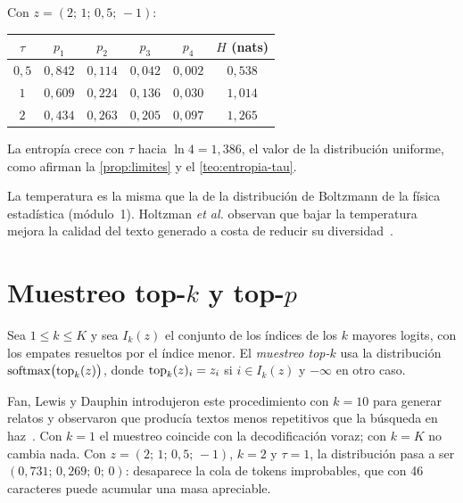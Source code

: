 \begin{ejemplo}\label{ej:temperatura}
Con $z=(2;\allowbreak\,1;\allowbreak\,0{,}5;\allowbreak\,-1)$:
\begin{center}\small
\begin{tabular}{@{}cccccc@{}}
\toprule
$\tau$ & $p_1$ & $p_2$ & $p_3$ & $p_4$ & $H$ (nats) \\
\midrule
$0{,}5$ & $0{,}842$ & $0{,}114$ & $0{,}042$ & $0{,}002$ & $0{,}538$ \\
$1$ & $0{,}609$ & $0{,}224$ & $0{,}136$ & $0{,}030$ & $1{,}014$ \\
$2$ & $0{,}434$ & $0{,}263$ & $0{,}205$ & $0{,}097$ & $1{,}265$ \\
\bottomrule
\end{tabular}
\end{center}
La entropía crece con $\tau$ hacia $\ln 4=1{,}386$, el valor de la distribución uniforme, como afirman la \cref{prop:limites} y el \cref{teo:entropia-tau}.
\end{ejemplo}

La temperatura es la misma que la de la distribución de Boltzmann de la física estadística (módulo~1). Holtzman \emph{et al.} observan que bajar la temperatura mejora la calidad del texto generado a costa de reducir su diversidad~\cite[§3.3]{holtzman}.

\section{Muestreo top-\texorpdfstring{$k$}{k} y top-\texorpdfstring{$p$}{p}}

\begin{definicion}[Top-$k$]\label{def:topk}
Sea $1\le k\le K$ y sea $I_k(z)$ el conjunto de los índices de los $k$ mayores logits, con los empates resueltos por el índice menor. El \emph{muestreo top-$k$} usa la distribución $\operatorname{softmax}\bigl(\operatorname{top}_k(z)\bigr)$, donde $\operatorname{top}_k(z)_i=z_i$ si $i\in I_k(z)$ y $-\infty$ en otro caso.
\end{definicion}

Fan, Lewis y Dauphin introdujeron este procedimiento con $k=10$ para generar relatos y observaron que producía textos menos repetitivos que la búsqueda en haz~\cite[§5.4]{fan}. Con $k=1$ el muestreo coincide con la decodificación voraz; con $k=K$ no cambia nada. Con $z=(2;\allowbreak\,1;\allowbreak\,0{,}5;\allowbreak\,-1)$, $k=2$ y $\tau=1$, la distribución pasa a ser $(0{,}731;\allowbreak\,0{,}269;\allowbreak\,0;\allowbreak\,0)$: desaparece la cola de tokens improbables, que con 46 caracteres puede acumular una masa apreciable.

